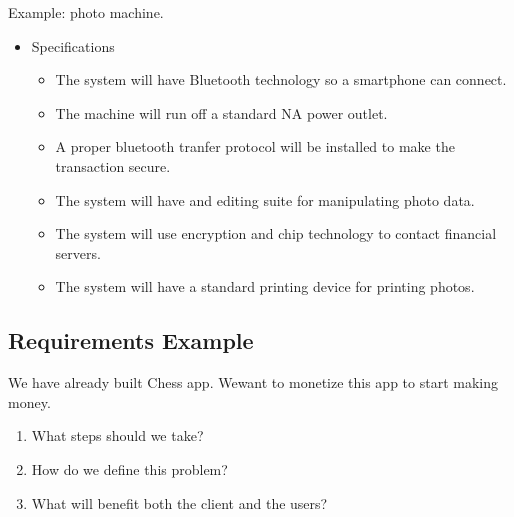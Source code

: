     Example: photo machine.

    \begin{itemize}
        \item Specifications
        \begin{itemize}
            \item The system will have Bluetooth technology so a smartphone can connect.
            \item The machine will run off a standard NA power outlet.
            \item A proper bluetooth tranfer protocol will be installed to make the transaction secure.
            \item The system will have and editing suite for manipulating photo data.
            \item The system will use encryption and chip technology to contact financial servers.
            \item The system will have a standard printing device for printing photos.
        \end{itemize}
    \end{itemize}

    \subsection{Requirements Example}

    We have already built Chess app. Wewant to monetize this app to start making money. 

    \begin{enumerate}
        \item What steps should we take?
        \item How do we define this problem?
        \item What will benefit both the client and the users?
    \end{enumerate}

